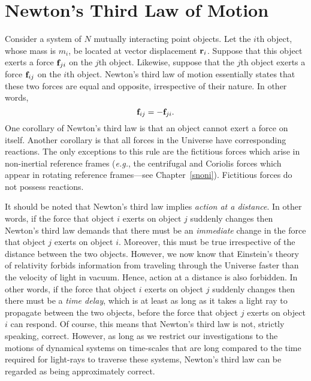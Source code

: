 \section{Newton's Third Law of Motion}\label{new3}
Consider a system of $N$ mutually interacting point objects.
Let the $i$th object, whose mass is $m_i$, be located at vector displacement ${\bf r}_i$.
Suppose that this object exerts a force ${\bf f}_{ji}$ on the $j$th object. 
Likewise, suppose that the $j$th object exerts a force ${\bf f}_{ij}$ on the
$i$th object.
Newton's third
law of motion essentially states that these two forces are equal and opposite, irrespective
of their nature.
In other words, 
\begin{equation}\label{e966}
{\bf f}_{ij} = - {\bf f}_{ji}.
\end{equation}
One corollary of Newton's third law is that an object cannot exert
a force on itself. Another corollary is that all forces in the Universe have corresponding reactions. The only exceptions to this
rule are the fictitious forces which arise in non-inertial reference frames ({\em e.g.}, the centrifugal and Coriolis
forces which appear in  rotating reference frames---see Chapter~\ref{snoni}). Fictitious forces do not possess  reactions.

It should be noted that Newton's third law implies {\em action at a
distance}. In other words, if the force  that object
$i$ exerts on object $j$ suddenly changes then Newton's third law
demands that there must be an {\em immediate}\/
change in the force that object
$j$ exerts on object $i$. Moreover, this must be true irrespective of the
distance between the two objects. However, we now know that
Einstein's theory of relativity forbids information  from traveling through the
Universe faster than the velocity of light in vacuum. Hence, action at a distance is also forbidden. In other words,  if the force  that object
$i$ exerts on object $j$ suddenly changes then there must be a
{\em time delay}, which is at least as long as it takes a light ray to propagate
between the two objects, before  the force that object
$j$ exerts on object $i$ can respond. Of course, this means that
Newton's third law is not, strictly speaking, correct. However, as
long as we restrict our investigations to the motions of dynamical
systems on time-scales that are long compared to the time
required for  light-rays to traverse these systems, Newton's third
law can be regarded as being approximately correct. 

